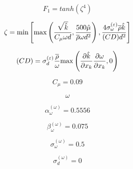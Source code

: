 {\newpage\clearpage
{}%
\begin{displaymath}
F_1 = tanh(\zeta^4)
\end{displaymath}%
\lthtmldisplayZ
\lthtmlcheckvsize\clearpage}

{\newpage\clearpage
{}%
\begin{displaymath}
\zeta = {\rm min} \left[ {\rm max} \left(
\frac{\sqrt{\hat k}}{C_{\mu} \omega d} , \frac{500 \hat \mu}{\overline \rho \omega d^2} \right) ,
\frac{4 \sigma_{\omega}^{(\varepsilon)}\overline \rho \hat k}
{(CD) d^2} \right]
\end{displaymath}%
\lthtmldisplayZ
\lthtmlcheckvsize\clearpage}

{\newpage\clearpage
{}%
\begin{displaymath}
(CD) = \sigma_d^{(\varepsilon)} \frac{\overline \rho}{\omega}
{\rm max} \left( \frac{\partial \hat k}{\partial x_k}
\frac{\partial \omega}{\partial x_k}, 0 \right)
\end{displaymath}%
\lthtmldisplayZ
\lthtmlcheckvsize\clearpage}

{\newpage\clearpage
{}%
\begin{displaymath}
C_{\mu} = 0.09
\end{displaymath}%
\lthtmldisplayZ
\lthtmlcheckvsize\clearpage}

{\newpage\clearpage
{}%
\begin{displaymath}
\omega
\end{displaymath}%
\lthtmldisplayZ
\lthtmlcheckvsize\clearpage}

{\newpage\clearpage
{}%
\begin{displaymath}
\alpha_{\omega}^{(\omega)} = 0.5556
\end{displaymath}%
\lthtmldisplayZ
\lthtmlcheckvsize\clearpage}

{\newpage\clearpage
{}%
\begin{displaymath}
\beta_{\omega}^{(\omega)} = 0.075
\end{displaymath}%
\lthtmldisplayZ
\lthtmlcheckvsize\clearpage}

{\newpage\clearpage
{}%
\begin{displaymath}
\sigma_{\omega}^{(\omega)} = 0.5
\end{displaymath}%
\lthtmldisplayZ
\lthtmlcheckvsize\clearpage}

{\newpage\clearpage
{}%
\begin{displaymath}
\sigma_d^{(\omega)} = 0
\end{displaymath}%
\lthtmldisplayZ
\lthtmlcheckvsize\clearpage}

